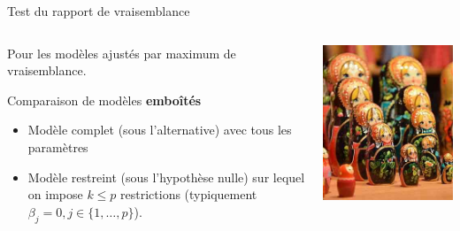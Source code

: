 \documentclass[
  ignorenonframetext,
]{beamer}
\providecommand{\tightlist}{%
  \setlength{\itemsep}{0pt}\setlength{\parskip}{0pt}}\usepackage{longtable,booktabs,array}
\begin{document}
\begin{frame}[fragile]{Test du rapport de vraisemblance}
\protect\hypertarget{test-du-rapport-de-vraisemblance}{}
\begin{columns}[T]
\begin{column}{0.6\textwidth}
Pour les modèles ajustés par maximum de vraisemblance.

Comparaison de modèles \textbf{emboîtés}

\begin{itemize}
\tightlist
\item
  Modèle complet (sous l'alternative) avec tous les paramètres
\item
  Modèle restreint (sous l'hypothèse nulle) sur lequel on impose
  \(k\leq p\) restrictions (typiquement
  \(\beta_j = 0, j \in \{1, \ldots, p\}\)).
\end{itemize}
\end{column}

\begin{column}{0.4\textwidth}
\includegraphics[width=1\textwidth,height=\textheight]{figures/poupeesrusses.jpg}
\end{column}
\end{columns}
\end{frame}
\end{document}
